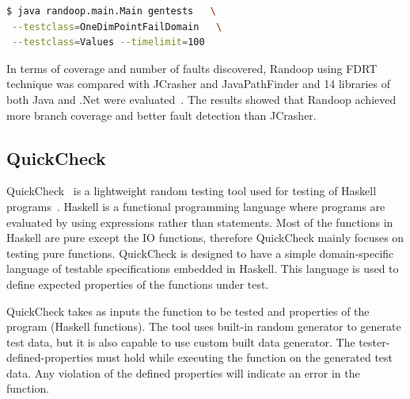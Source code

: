 \begin{lstlisting}[language=bash]
$ java randoop.main.Main gentests   \
 --testclass=OneDimPointFailDomain   \
 --testclass=Values --timelimit=100
\end{lstlisting}

In terms of coverage and number of faults discovered, Randoop using FDRT technique was compared with JCrasher and JavaPathFinder and 14 libraries of both Java and .Net were evaluated~\cite{visser2004test}. The results showed that Randoop achieved more branch coverage and better fault detection than JCrasher. 

\subsection{QuickCheck}
QuickCheck~\cite{claessen2011quickcheck} is a lightweight random testing tool used for testing of Haskell programs~\cite{hudak2007history}. Haskell is a functional programming language where programs are evaluated by using expressions rather than statements. Most of the functions in Haskell are pure except the IO functions, therefore QuickCheck mainly focuses on testing pure functions. QuickCheck is designed to have a simple domain-specific language of testable specifications embedded in Haskell. This language is used to define expected properties of the functions under test. %

QuickCheck takes as inputs the function to be tested and properties of the program (Haskell functions). The tool uses built-in random generator to generate test data, but it is also capable to use custom built data generator. The tester-defined-properties must hold while executing the function on the generated test data. Any violation of the defined properties will indicate an error in the function.







